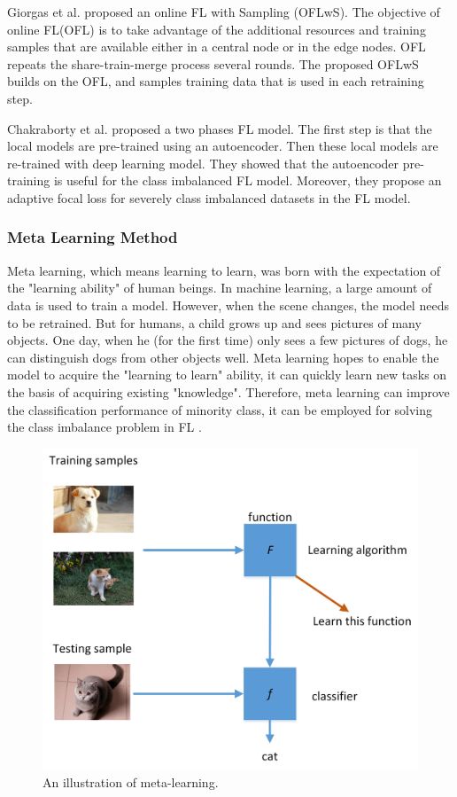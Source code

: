 \documentclass[10pt,journal,compsoc]{IEEEtran}
\begin{document}
	Giorgas et al. \cite{giorgas2020online} proposed an online FL with Sampling (OFLwS). The objective of online FL(OFL) \cite{yang2019federated} is to take advantage of the additional resources and training samples that are available either in a central node or in the edge nodes. OFL repeats the share-train-merge process several rounds. The proposed OFLwS builds on the OFL, and samples training data that is used in each retraining step. 
	
	Chakraborty et al. \cite{chakraborty2022improving} proposed a two phases FL model. The first step is that the local models are pre-trained using an autoencoder. Then these local models are re-trained with deep learning model. They showed that the autoencoder pre-training is useful for the class imbalanced FL model. Moreover, they propose an adaptive focal loss for severely class imbalanced datasets in the FL model. 
	
	\subsubsection{Meta Learning Method}
	Meta learning, which means learning to learn, was born with the expectation of the "learning ability" of human beings. In machine learning, a large amount of data is used to train a model. However, when the scene changes, the model needs to be retrained. But for humans, a child grows up and sees pictures of many objects. One day, when he (for the first time) only sees a few pictures of dogs, he can distinguish dogs from other objects well. Meta learning hopes to enable the model to acquire the "learning to learn" ability, it can quickly learn new tasks on the basis of acquiring existing "knowledge". Therefore, meta learning can improve the classification performance of minority class, it can be employed for solving the class imbalance problem in FL \cite{zheng2021federated} \cite{zheng2020novel}.
	
	\begin{figure}[htbp]
		\centering
		\includegraphics[scale=0.6]{meta.jpg}
		\caption{An illustration of meta-learning.}
		\label{meta-learning}
	\end{figure}
	
\end{document}
